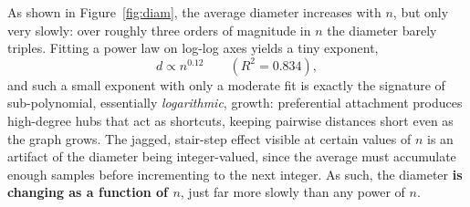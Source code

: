 As shown in Figure~\ref{fig:diam}, the average diameter increases with $n$, but only
very slowly: over roughly three orders of magnitude in $n$ the diameter barely triples.
Fitting a power law on log-log axes yields a tiny exponent,
\begin{equation*}
    d \propto n^{0.12} \qquad (R^2 = 0.834),
\end{equation*}
and such a small exponent with only a moderate fit is exactly the signature of
sub-polynomial, essentially \emph{logarithmic}, growth: preferential attachment
produces high-degree hubs that act as shortcuts, keeping pairwise distances short
even as the graph grows. The jagged, stair-step effect visible at certain values of
$n$ is an artifact of the diameter being integer-valued, since the average must
accumulate enough samples before incrementing to the next integer. As such, the
diameter \textbf{is changing as a function of $n$}, just far more slowly than any
power of $n$.



